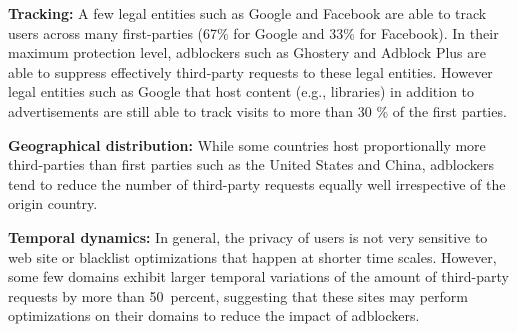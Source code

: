 \documentclass[compsoc, conference, letterpaper, 10pt, times]{IEEEtran}
\begin{document}
\vspace{0.5 em}\noindent \textbf{Tracking:}
A few legal entities such as Google and Facebook are able to track users across many first-parties (67\% for Google and 33\% for Facebook). In their maximum protection level, adblockers such as Ghostery and Adblock Plus are able to suppress effectively third-party requests to these legal entities. However legal entities such as Google that host content (e.g., libraries) in addition to advertisements are still able to track visits to more than 30 \% of the first parties.

\vspace{0.5 em}\noindent \textbf{Geographical distribution:}
While some countries host proportionally more third-parties than first parties such as the United States and China, adblockers tend to reduce the number of third-party requests equally well irrespective of the origin country.

\vspace{0.5 em}\noindent \textbf{Temporal dynamics:} In general, the privacy of users is not very sensitive to web site or blacklist optimizations that happen at shorter time scales. However, some few domains exhibit larger temporal variations of the amount of third-party requests by more than 50~percent, suggesting that these sites may perform optimizations on their domains to reduce the impact of adblockers.






\end{document}

